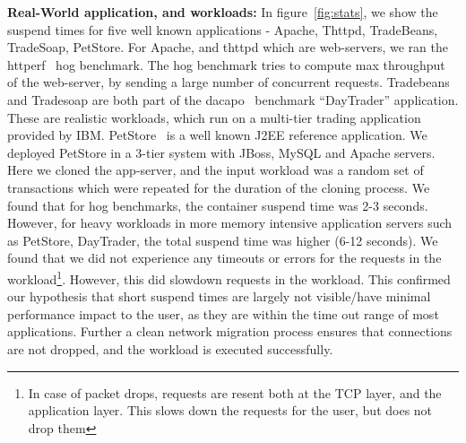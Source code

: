 \noindent
\textbf{Real-World application, and workloads:}
In figure~\ref{fig:stats}, we show the suspend times for five well known applications - Apache, Thttpd, TradeBeans, TradeSoap, PetStore. 
For Apache, and thttpd which are web-servers, we ran the httperf~\cite{httperf} hog benchmark. 
The hog benchmark tries to compute max throughput of the web-server, by sending a large number of concurrent requests.
Tradebeans and Tradesoap are both part of the dacapo~\cite{dacapo} benchmark ``DayTrader'' application.
These are realistic workloads, which run on a multi-tier trading application provided by IBM. 
PetStore~\cite{petstore} is a well known J2EE reference application. 
We deployed PetStore in a 3-tier system with JBoss, MySQL and Apache servers.
Here we cloned the app-server, and the input workload was a random set of transactions which were repeated for the duration of the cloning process.
We found that for hog benchmarks, the container suspend time was 2-3 seconds.
However, for heavy workloads in more memory intensive application servers such as PetStore, DayTrader, the total suspend time was higher (6-12 seconds).
We found that we did not experience any timeouts or errors for the requests in the workload\footnote{In case of packet drops, requests are resent both at the TCP layer, and the application layer. This slows down the requests for the user, but does not drop them}.
However, this did slowdown requests in the workload. 
This confirmed our hypothesis that short suspend times are largely not visible/have minimal performance impact to the user, as they are within the time out range of most applications.
Further a clean network migration process ensures that connections are not dropped, and the workload is executed successfully.


